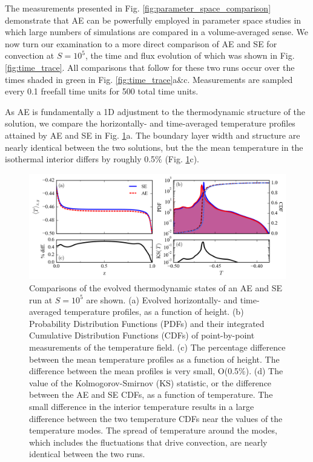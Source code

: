 \documentclass[aps, pre, onecolumn, nofootinbib, notitlepage, groupedaddress, amsfonts, amssymb, amsmath, longbibliography]{revtex4-1}
\begin{document}
The measurements presented in Fig. \ref{fig:parameter_space_comparison} demonstrate
that AE can be powerfully employed in parameter space studies in which
large numbers of simulations are compared in a volume-averaged sense.  We now turn
our examination to a more direct comparison of AE and SE for convection at
$S = 10^5$, the time and flux evolution of which was shown in Fig. \ref{fig:time_trace}.
All comparisons that follow for these two runs occur over the times shaded in
green in Fig. \ref{fig:time_trace}a\&c. Measurements are sampled every
0.1 freefall time units for 500 total time units.

As AE is fundamentally a 1D adjustment to the thermodynamic structure of the
solution, we compare the horizontally- and time-averaged temperature profiles 
attained by AE and SE in Fig. \ref{fig:temp_comparison}a.  
The boundary layer width and structure are  
nearly identical between the two solutions, but the
the mean temperature in the isothermal interior differs by roughly 0.5\%
(Fig. \ref{fig:temp_comparison}c). 

\begin{figure}[b]
\includegraphics[width=\textwidth]{./figs/temp_comparison.png}
\caption{Comparisons of the evolved thermodynamic states of an AE and SE run
at $S = 10^{5}$ are shown.  (a) Evolved horizontally- and time-averaged 
temperature profiles, as a function of height.
(b) Probability Distribution Functions (PDFs) and their integrated
Cumulative Distribution Functions (CDFs)
of point-by-point measurements of the temperature field.
(c) The percentage difference between the mean temperature profiles as a function of height.
The difference between the mean profiles is very small, O(0.5\%).
(d) The value of the Kolmogorov-Smirnov (KS) statistic, or the difference between
the AE and SE CDFs, as a function of temperature.
The small
difference in the interior temperature 
results in a large difference between the two temperature CDFs near the values
of the temperature modes.  The spread of temperature around the modes, which includes the 
fluctuations that drive convection, are nearly identical between the two runs.
\label{fig:temp_comparison} }
\end{figure}
\end{document}
